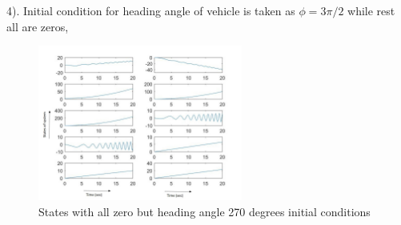 \documentclass[12pt]{article}
\begin{document}
4). Initial condition for heading angle of vehicle is taken as $\phi=3\pi/2$ while rest all are zeros,
\begin{figure}[H]
\centering
\includegraphics[width=0.6\textwidth]{3piby2.jpg}
\captionsetup{labelformat=empty}
\caption{States with all zero but heading angle 270 degrees initial conditions}
\end{figure}
\end{document}

